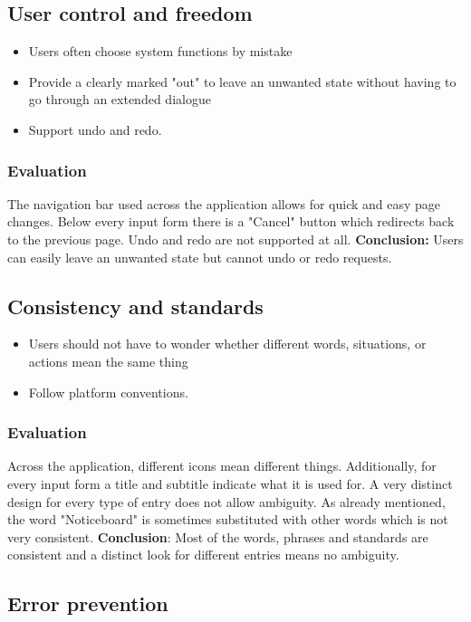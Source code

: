 \subsection{User control and freedom}

\begin{itemize}
    \item Users often choose system functions by mistake
    \item Provide a clearly marked "out" to leave an unwanted state without having to go through an extended dialogue
    \item Support undo and redo.
\end{itemize}

\subsubsection{Evaluation}
The navigation bar used across the application allows for quick and easy page changes. Below every input form there is a "Cancel" button which redirects back to the previous page. Undo and redo are not supported at all. \textbf{Conclusion:} Users can easily leave an unwanted state but cannot undo or redo requests.


\subsection{Consistency and standards}

\begin{itemize}
    \item Users should not have to wonder whether different words, situations, or actions mean the same thing
    \item Follow platform conventions.
\end{itemize}

\subsubsection{Evaluation}
Across the application, different icons mean different things. Additionally, for every input form a title and subtitle indicate what it is used for. A very distinct design for every type of entry does not allow ambiguity. As already mentioned, the word "Noticeboard" is sometimes substituted with other words which is not very consistent. \textbf{Conclusion}: Most of the words, phrases and standards are consistent and a distinct look for different entries means no ambiguity.

\subsection{Error prevention}

